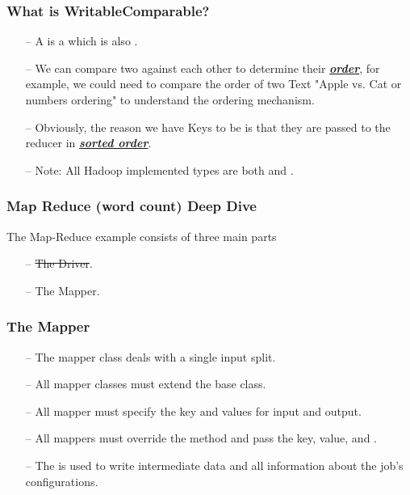 \begin{frame}[c]{ }
	\frametitle{What is WritableComparable?}
	
	\begin{itemize}  [<+->]
		\item [--] A  is a  which is also .
		\item [--] We can compare two  against each other to determine their \textbf{\underline{\textit{order}}}, for example, we could need to compare the order of two Text "Apple vs. Cat or numbers ordering" to understand the ordering mechanism. 
		\item [--] Obviously, the reason we have Keys to be  is that they are passed to the reducer in \underline{\textit{\textbf{sorted order}}}.
		\item [--] Note: All Hadoop implemented types are both  and .
		
		
	\end{itemize}		
	
\end{frame}
\begin{frame}[c]{ }
	\frametitle{Map Reduce (word count) Deep Dive }
	
	The Map-Reduce example consists of three main parts
	
	\begin{itemize}  [<+->]
		\item [--] \sout{The Driver}.
		\item [--] The Mapper.

		
	\end{itemize}
\end{frame}
\begin{frame}[c]{ }
	\frametitle{The Mapper}
		
	\begin{itemize}  [<+->]
		
		\item [--] The mapper class deals with a single input split.
		
		\item [--] All mapper classes must extend the  base class.

		\item [--] All mapper must specify the key and values for input and output.		
		
		\item [--] All mappers must override the  method and pass the key, value, and .
		
		\item [--]  The  is used to write intermediate data and all information about the job's configurations.
		
	\end{itemize}
	
\end{frame}

